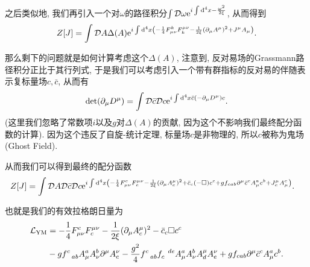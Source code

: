 之后类似地, 我们再引入一个对$\omega$的路径积分$\int\mathcal D\omega\exp{i\int\d^4x-\frac{\omega^2}{2\xi}}$, 从而得到
\begin{align}
    Z[J]=\int\mathcal DA\Delta(A)\exp{i\int\d^4x\left(-\frac14F_{\mu\nu}^kF^{\mu\nu}_k-\frac1{2\xi}(\partial_\mu A^\mu)^2+J^\mu A_\mu\right)}.
\end{align}

那么剩下的问题就是如何计算考虑这个$\Delta(A)$, 注意到, 反对易场的Grassmann路径积分正比于其行列式, 于是我们可以考虑引入一个带有群指标的反对易的伴随表示复标量场$c, \bar c$, 从而有
\begin{align}
    \det(\partial_\mu D^\mu)=\int\mathcal D\bar c\mathcal Dc\exp{i\int\d^4x\bar c (-\partial_\mu D^\mu) c}.
\end{align}
(这里我们忽略了常数项$i$以及$g$对$\Delta(A)$的贡献, 因为这个不影响我们最终配分函数的计算). 因为这个违反了自旋-统计定理, 标量场$c$是非物理的, 所以$c$被称为鬼场(Ghost Field).

从而我们可以得到最终的配分函数
\begin{align}
    Z[J]&=\int\mathcal DA\mathcal D\bar c\mathcal Dc\exp{i\int\d^4x\left(-\frac14F_{\mu\nu}^cF^{\mu\nu}_c-\frac1{2\xi}(\partial_\mu A^\mu_c)^2+\bar c_c (-\Box) c^c+gf_{cab}\partial^\mu\bar c^c A_\mu^a c^b+J^\mu_c A_\mu^c\right)}.
\end{align}

也就是我们的有效拉格朗日量为
\begin{align}
    \mathcal L_{\rm{YM}}&=-\frac14F_{\mu\nu}^cF^{\mu\nu}_c-\frac1{2\xi}(\partial_\mu A^\mu_c)^2-\bar c_c \Box c^c\notag\\
    &-g f^c_{~~ab}A_\mu^aA_\nu^b\partial^\mu A^\nu_c-\frac{g^2}4 f^c_{~~ab}f_c^{~~de} A^a_\mu A_\nu^bA^\mu_dA^\nu_e+gf_{cab}\partial^\mu\bar c^c A_\mu^a c^b.
\end{align}

